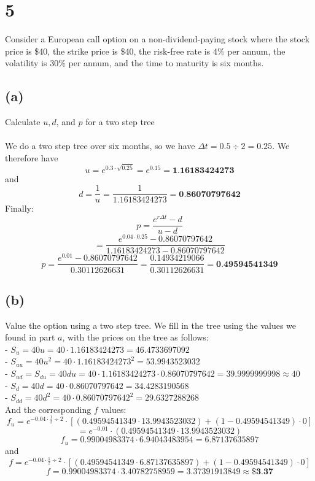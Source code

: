 \documentclass{article}
\begin{document}
{\Large 

\section*{5}

Consider a European call option on a non-dividend-paying stock where the stock price is \$40, the strike price is \$40, the risk-free rate is 4\% per annum, the volatility is 30\% per annum, and the time to maturity is six months.

\subsection*{(a)} 
Calculate \(u, d\), and \(p\) for a two step tree \\ \\
We do a two step tree over six months, so we have \(\Delta t = 0.5 \div 2 = 0.25\). We therefore have 
\[
  u = e^{0.3 \cdot \sqrt{0.25}} = e ^ {0.15} = \boxed{\textbf{1.16183424273}}
\]
and 
\[
  d = \frac{1}{u} = \frac{1}{1.16183424273} = \boxed{\textbf{0.86070797642}}
\]
Finally:
\[
  p = \frac{e^{r \Delta t} - d}{u - d}
\]
\[
  = \frac{e^{0.04 \cdot 0.25} - 0.86070797642}{1.16183424273 - 0.86070797642}
\]
\[
  p = \frac{e^{0.01} - 0.86070797642}{0.30112626631} = \frac{0.14934219066}{0.30112626631} = \boxed{\textbf{0.49594541349}}
\]

\subsection*{(b)}
Value the option using a two step tree.
We fill in the tree using the values we found in part \(a\), with the prices on the tree as follows: \\
- \(S_{u} = 40u = 40 \cdot 1.16183424273 = 46.4733697092\) \\
- \(S_{uu} = 40u^2 = 40 \cdot 1.16183424273^2 = 53.9943523032\) \\
- \(S_{ud} = S_{du} = 40du = 40 \cdot 1.16183424273 \cdot 0.86070797642 = 39.9999999998 \approx 40 \) \\
- \(S_{d} = 40d = 40 \cdot 0.86070797642 = 34.4283190568\) \\
- \(S_{dd} = 40d^2 = 40 \cdot 0.86070797642^2 = 29.6327288268\) \\
And the corresponding \(f\) values: \\
\[
  f_u = e^{-0.04 \cdot \frac{1}{2} \div 2} \cdot [(0.49594541349 \cdot 13.9943523032) + (1 - 0.49594541349) \cdot 0]
\]
\[
  = e^{-0.01} \cdot (0.49594541349 \cdot 13.9943523032)
\]
\[
  f_u = 0.99004983374 \cdot 6.94043483954 = 6.87137635897
\]
and 
\[
  f = e^{-0.04 \cdot \frac{1}{2} \div 2} \cdot [(0.49594541349 \cdot 6.87137635897) + (1 - 0.49594541349) \cdot 0]
\]
\[
  f = 0.99004983374 \cdot 3.40782758959 = 3.37391913849 \approx \boxed{\textbf{\$3.37}}
\]

}
\end{document}
